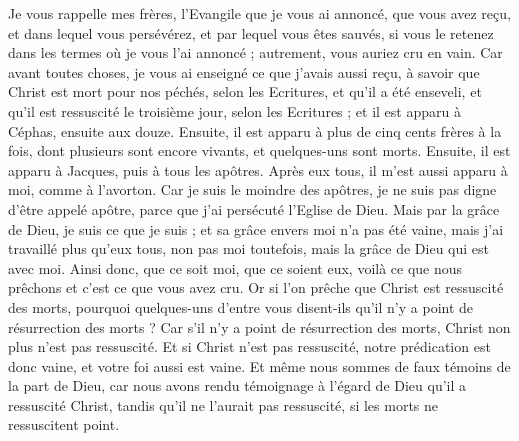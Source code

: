 \begin{multicols}{2}
\VerseOne{}Je vous rappelle mes frères, l'Evangile que je vous ai annoncé, que vous avez reçu, et dans lequel vous persévérez,
et par lequel vous êtes sauvés, si vous le retenez dans les termes où je vous l'ai annoncé ; autrement, vous auriez cru en vain.
Car avant toutes choses, je vous ai enseigné ce que j'avais aussi reçu, à savoir que Christ est mort pour nos péchés, selon les Ecritures,
et qu'il a été enseveli, et qu'il est ressuscité le troisième jour, selon les Ecritures ;
et il est apparu à Céphas, ensuite aux douze.
Ensuite, il est apparu à plus de cinq cents frères à la fois, dont plusieurs sont encore vivants, et quelques-uns sont morts.
Ensuite, il est apparu à Jacques, puis à tous les apôtres.
Après eux tous, il m’est aussi apparu à moi, comme à l’avorton.
Car je suis le moindre des apôtres, je ne suis pas digne d'être appelé apôtre, parce que j'ai persécuté l'Eglise de Dieu.
Mais par la grâce de Dieu, je suis ce que je suis ; et sa grâce envers moi n'a pas été vaine, mais j'ai travaillé plus qu'eux tous, non pas moi toutefois, mais la grâce de Dieu qui est avec moi.
Ainsi donc, que ce soit moi, que ce soient eux, voilà ce que nous prêchons et c’est ce que vous avez cru.
Or si l’on prêche que Christ est ressuscité des morts, pourquoi quelques-uns d'entre vous disent-ils qu'il n'y a point de résurrection des morts ?
Car s'il n'y a point de résurrection des morts, Christ non plus n'est pas ressuscité.
Et si Christ n'est pas ressuscité, notre prédication est donc vaine, et votre foi aussi est vaine.
Et même nous sommes de faux témoins de la part de Dieu, car nous avons rendu témoignage à l’égard de Dieu qu'il a ressuscité Christ, tandis qu’il ne l’aurait pas ressuscité, si les morts ne ressuscitent point.

\end{multicols}
